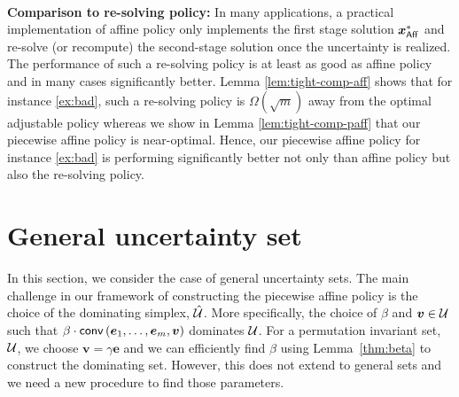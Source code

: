 \documentclass[11pt]{article}
\theoremstyle{plain}
\theoremstyle{definition}
\numberwithin{equation}{section}%
\numberwithin{equation}{section}%
\newcommand{\mb}[1]{\ensuremath{\boldsymbol{#1}}}
\begin{document}
{\\
\noindent
{\bf Comparison to re-solving policy:}
In many applications, a practical implementation of affine policy only implements the first stage solution $\mb x^*_{\sf Aff}$ and re-solve (or recompute) the second-stage solution once the uncertainty is realized. The performance of such a re-solving policy is at least as good as affine policy and in many cases significantly better. Lemma \ref{lem:tight-comp-aff} shows that for instance \eqref{ex:bad}, such a re-solving policy is $\Omega(\sqrt{m})$ away from the optimal adjustable policy whereas we show in  Lemma \ref{lem:tight-comp-paff}
that our piecewise affine policy is near-optimal. Hence, our piecewise affine policy for instance \eqref{ex:bad} is  performing significantly better not only than affine policy but also the re-solving policy.
}

\section{General uncertainty set} \label{sec:gen}

In this section, we consider the case of general uncertainty sets. The main challenge in our framework of constructing the piecewise affine policy is the choice of the dominating simplex, $\hat{\cal U }$. More specifically, the choice of $\beta$ and $\mb v \in {\cal U}$ such that $ \beta \cdot {\sf conv } \left( \mb e_1,\ldots,\mb e_m, \mb v \right)$ dominates ${\cal U }$. For a permutation invariant set, ${\cal U}$, we choose $\mb v= \gamma  \mb e$ and we can efficiently find $ \beta$ using Lemma~\ref{thm:beta} to construct the dominating set. However, this does not extend to general sets and we need a new procedure to find those parameters.
\end{document}
